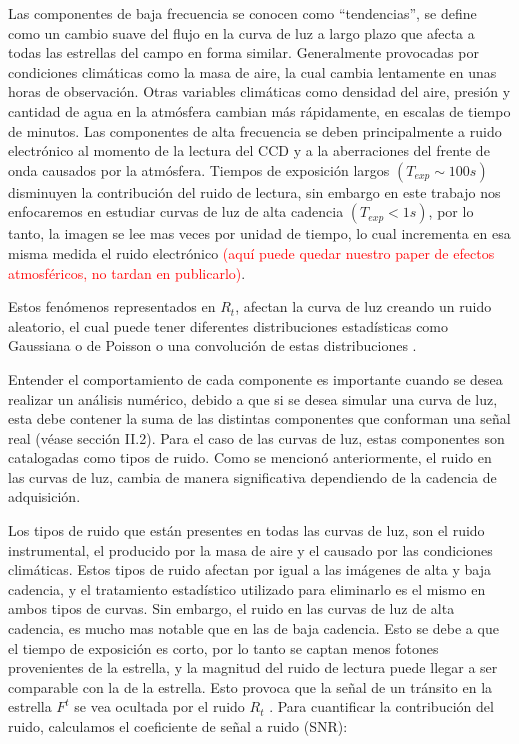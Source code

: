 Las componentes de baja frecuencia se conocen como ``tendencias'', se define como un cambio suave del flujo en la curva de luz a largo plazo que afecta a todas las estrellas del campo en forma similar. Generalmente provocadas por condiciones climáticas como la masa de aire, la cual cambia lentamente en unas horas de observación. Otras variables climáticas como densidad del aire, presión y cantidad de agua en la atmósfera cambian más rápidamente, en escalas de tiempo de minutos. Las componentes de alta frecuencia se deben principalmente a ruido electrónico al momento de la lectura del CCD y a la aberraciones del frente de onda causados por la atm\'osfera. Tiempos de exposición largos $(T_{exp} \sim 100 s)$ disminuyen la contribución del ruido de lectura, sin embargo en este trabajo nos enfocaremos en estudiar curvas de luz de alta cadencia $(T_{exp} < 1 s)$, por lo tanto, la imagen se lee mas veces por unidad de tiempo, lo cual incrementa en esa misma medida el ruido electr\'onico \textcolor{red}{(aquí puede quedar nuestro paper de efectos atmosféricos, no tardan en publicarlo)}.

Estos fenómenos representados en $R_{t}$, afectan la curva de luz creando un ruido aleatorio, el cual puede tener diferentes distribuciones estadísticas como Gaussiana o de Poisson o una convolución de estas distribuciones \cite{luisier2010image}.

Entender el comportamiento de cada componente es importante cuando se desea realizar un análisis numérico, debido a que si se desea simular una curva de luz, esta debe contener la suma de las distintas componentes que conforman una señal real (véase sección II.2). Para el caso de las curvas de luz, estas componentes son catalogadas como tipos de ruido. Como se mencionó anteriormente, el ruido en las curvas de luz, cambia de manera significativa dependiendo de la cadencia de adquisición.

Los tipos de ruido que están presentes en todas las curvas de luz, son el ruido instrumental, el producido por la masa de aire y el causado por las condiciones climáticas. Estos tipos de ruido afectan por igual a las imágenes de alta y baja cadencia, y el tratamiento estadístico utilizado para eliminarlo es el mismo en ambos tipos de curvas. Sin embargo, el ruido en las curvas de luz de alta cadencia, es mucho mas notable que en las de baja cadencia. Esto se debe a que el tiempo de exposición es corto, por lo tanto se captan menos fotones provenientes de la estrella, y la magnitud del ruido de lectura puede llegar a ser comparable con la de la estrella. Esto provoca que la señal de un tránsito en la estrella $F^{t}$  se vea ocultada por el ruido $R_{t}$ \cite{pont2006effect}. Para cuantificar la contribución del ruido, calculamos el coeficiente de señal a ruido (SNR):

